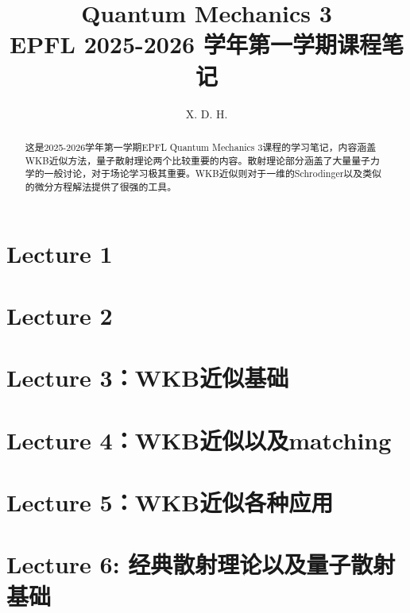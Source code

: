 \documentclass[10pt]{article}
\begin{document}
\title{\boldmath Quantum Mechanics 3 \\ \large EPFL 2025-2026 学年第一学期课程笔记}
\author{X. D. H.}

\maketitle

\begin{abstract}
  这是2025-2026学年第一学期EPFL Quantum Mechanics 3课程的学习笔记，内容涵盖WKB近似方法，量子散射理论两个比较重要的内容。散射理论部分涵盖了大量量子力学的一般讨论，对于场论学习极其重要。WKB近似则对于一维的Schrodinger以及类似的微分方程解法提供了很强的工具。
\end{abstract}

\tableofcontents
\section{Lecture 1}\label{sec:Lecture 1} %


\newpage
\section{Lecture 2}\label{sec:Lecture 2} %


\newpage 
\section{Lecture 3：WKB近似基础}\label{sec:Lecture 3} %


\newpage 
\section{Lecture 4：WKB近似以及matching}\label{sec:Lecture 4} %


\newpage
\section{Lecture 5：WKB近似各种应用}\label{sec:Lecture 5：WKB近似各种应用} %


\newpage 
\section{Lecture 6: 经典散射理论以及量子散射基础}\label{sec:Lecture 6:} %

\end{document}
